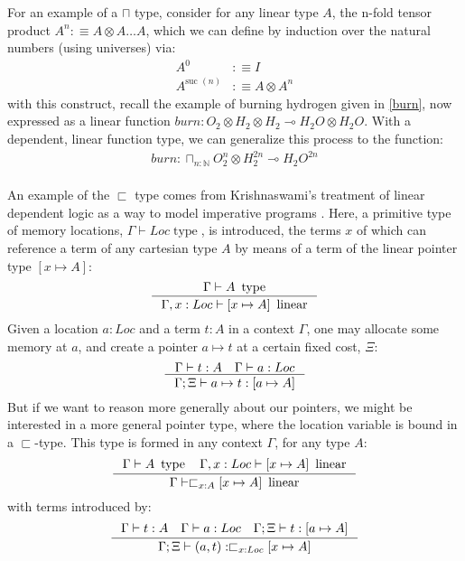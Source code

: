 \documentclass[a4paper,english]{lipics-v2018}
\DeclareMathOperator{\type}{\text{ type}}
\DeclareMathOperator{\linear}{\text{ linear}}
\begin{document}
For an example of a $\sqcap$ type, consider for any linear type $A$, the n-fold tensor product $A^n :\equiv A \otimes A \dots A$, which we can define by induction over the natural numbers (using universes) via:
\[
  \begin{split}
  A^0 &:\equiv I\\
  A^{\text{suc }(n)} &:\equiv A \otimes A^n
  \end{split}
\]
with this construct, recall the example of burning hydrogen given in \ref{burn}, now expressed as a linear function $burn : O_2 \otimes H_2 \otimes H_2 \multimap H_2O \otimes H_2O$. With a dependent, linear function type, we can generalize this process to the function:
\[
  \begin{split}
  burn : \sqcap_{n : \mathbb{N}}O_2^n \otimes H_2^{2n} \multimap H_2O^{2n}
  \end{split}
\]
\\
An example of the $\sqsubset$ type comes from Krishnaswami's treatment of linear dependent logic as a way to model imperative programs \cite{krishnaswami}. Here, a primitive type of memory locations, $\Gamma \vdash Loc \type$, is introduced, the terms $x$ of which can reference a term of any cartesian type $A$ by means of a term of the linear pointer type $[x \mapsto A]$:
\[ 
  \inference{\Gamma \vdash A \type}
  {\Gamma, x : Loc \vdash [x \mapsto A] \linear}
\]
Given a location $a : Loc$ and a term $t : A$ in a context $\Gamma$, one may allocate some memory at $a$, and create a pointer $a \mapsto t$ at a certain fixed cost, $\Xi$:
\[
  \inference{\Gamma \vdash t : A \quad \Gamma \vdash a : Loc}
  {\Gamma; \Xi \vdash a \mapsto t : [a \mapsto A]}
\]
But if we want to reason more generally about our pointers, we might be interested in a more general pointer type, where the location variable is bound in a $\sqsubset$-type. This type is formed in any context $\Gamma$, for any type $A$:
\[
  \inference{\Gamma \vdash A \type \quad \Gamma, x : Loc \vdash [x \mapsto A] \linear} 
  {\Gamma \vdash \sqsubset_{x : A}[x \mapsto A] \linear}
\]
with terms introduced by:
\[
  \inference{\Gamma \vdash t : A \quad \Gamma \vdash a : Loc \quad \Gamma; \Xi \vdash t : [a \mapsto A]}
  {\Gamma; \Xi \vdash (a, t) : \sqsubset_{x : Loc} [x \mapsto A]}
\]
\end{document}
